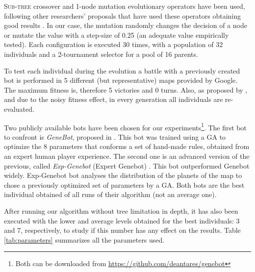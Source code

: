 \lettrine{S}{ub-tree} crossover and 1-node mutation evolutionary operators have been used, following other researchers' proposals that have used these operators obtaining good results \cite{Esparcia2013GPunreal}. In our case, the mutation randomly changes the decision of a node or mutate the value with a step-size of 0.25 (an adequate value empirically tested). Each configuration is executed 30 times, with a population of 32 individuals and a 2-tournament selector for a pool of 16 parents.

To test each individual during the evolution a battle with a previously created bot is performed in 5 different (but representative) maps provided by Google. The maximum fitness is, therefore 5 victories and 0 turns. Also, as proposed by \cite{Mora2012Genebot}, and due to the noisy fitness effect, in every generation all individuals are re-evaluated.


Two publicly available bots have been chosen for our experiments\footnote{Both can be downloaded from \url{https://github.com/deantares/genebot}}. The first bot to confront is {\em GeneBot}, proposed in \cite{Mora2012Genebot}. This bot was trained using a GA to optimize the 8 parameters that conforms a set of hand-made rules, obtained from an expert human player experience. The second one is an advanced version of the previous, called {\em Exp-Genebot} (Expert Genebot) \cite{FernandezAres2012adaptive}. This bot outperformed Genebot widely. Exp-Genebot bot analyses the distribution of the planets of the map to chose a previously optimized set of parameters by a GA.  Both bots are the best individual obtained of all runs of their algorithm (not an average one).

After running our algorithm without tree limitation in depth, it has also been executed with the lower and average levels obtained for the best individuals: 3 and 7, respectively, to study if this number has any effect on the results.   Table \ref{tab:parameters} summarizes all the parameters used.

